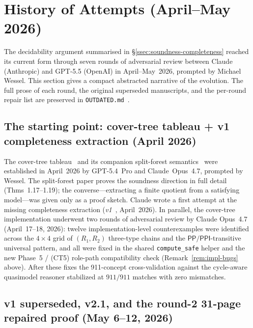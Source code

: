\documentclass[
]{ceurart}
\theoremstyle{definition}
\newcommand{\PP}{\ensuremath{\mathsf{PP}}}
\newcommand{\PPI}{\ensuremath{\mathsf{PPI}}}
\begin{document}
\section{History of Attempts (April--May 2026)}
\label{sec:history-of-attempts}

The decidability argument summarised in
\S\ref{ssec:soundness-completeness} reached its current form
through seven rounds of adversarial review between Claude
(Anthropic) and GPT-5.5 (OpenAI) in April--May~2026, prompted by
Michael Wessel.  This section gives a compact abstracted
narrative of the evolution.  The full prose of each round, the
original superseded manuscripts, and the per-round repair list
are preserved in
\texttt{OUTDATED.md}~\cite{ALCIRCC5Outdated}.

\subsection{The starting point: cover-tree tableau + v1
completeness extraction (April 2026)}

The cover-tree tableau~\cite{CoverTree,CoverTreeImpl} and its
companion split-forest semantics~\cite{SiblingCompleted} were
established in April~2026 by GPT-5.4~Pro and
Claude~Opus~4.7, prompted by Wessel.  The split-forest paper
proves the soundness direction in full detail (Thms~1.17--1.19);
the converse---extracting a finite quotient from a satisfying
model---was given only as a proof sketch.  Claude wrote a first
attempt at the missing completeness extraction
(\textit{v1}~\cite{CompletenessExtractionV1}, April~2026).  In
parallel, the cover-tree implementation underwent two rounds of
adversarial review by Claude Opus~4.7 (April~17--18, 2026):
twelve implementation-level counterexamples were identified
across the $4\times 4$ grid of $(R_1,R_2)$ three-type chains
and the $\PP/\PPI$-transitive universal pattern, and all were
fixed in the shared \texttt{compute\_safe} helper and the new
Phase~5 / (CT5) role-path compatibility check
(Remark~\ref{rem:impl-bugs} above).  After these fixes the
911-concept cross-validation against the cycle-aware quasimodel
reasoner stabilized at $911/911$ matches with zero mismatches.

\subsection{v1 superseded, v2.1, and the round-2 31-page repaired
proof (May 6--12, 2026)}
\end{document}

